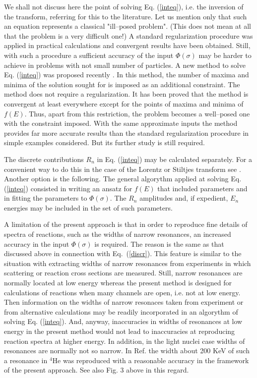 \documentclass[12pt,ams,preprint,a4paper]{revtex4}
\begin{document}
We shall not discuss here the point of solving Eq. (\ref{inteq}), i.e. the inversion of the transform,
referring for this to the literature. Let us mention only that such an equation
represents a classical "ill--posed problem". (This does not mean at all that the problem is a 
very difficult one!)
A standard 
regularization procedure was applied in practical calculations and convergent results
have been obtained. Still, with such a procedure 
a sufficient accuracy of the input $\Phi(\sigma)$ 
 may be harder to achieve in problems with not small number of particles. 
A new method to solve Eq. (\ref{inteq}) was proposed recently \cite{efr12}. 
In this method, the number of
maxima and minima of the solution sought for is imposed as an additional constraint. 
The method does not require a regularization. It has been proved 
that the method is convergent at least everywhere 
 except for the points of maxima and minima of $f(E)$. 
Thus, apart from this restriction, 
the problem becomes a well--posed one with the constraint imposed.
 With the same
approximate inputs the method provides far more accurate results than 
the standard regularization procedure in simple examples considered. But its further study 
is still required.

The discrete contributions $R_n$ in Eq. (\ref{inteq}) may be calculated separately. For a convenient way
to do this in the case of the Lorentz or Stiltjes transform see \cite{efr99}. Another option is 
the following. The general algorythm applied at solving Eq. (\ref{inteq}) consisted in writing an ansatz
for $f(E)$ that included parameters and in fitting the parameters to $\Phi(\sigma)$. 
The $R_n$ amplitudes and, if expedient, $E_n$ energies may be included in the set of such parameters.  

A limitation of the present approach is that in order to reproduce fine details of spectra of 
reactions, such as the widths of narrow resonances, an increased accuracy in the input 
$\Phi(\sigma)$ is required. The reason is the same as that discussed above in connection with Eq.~(\ref{discr}). 
This feature is similar to the situation with extracting widths of 
narrow resonances from experiments in which scattering or reaction cross sections are measured.
Still, narrow resonances are normally located at low energy whereas the present method is designed
for calculations of reactions when many channels are open, i.e. not at low energy. Then information
on the widths of narrow resonaces taken from experiment or from 
alternative calculations may be readily incorporated 
in an algorythm of solving Eq. (\ref{inteq}). And, anyway, inaccuracies
in widths of resonances at low energy in the present method would not lead to inaccuracies 
at reproducing reaction spectra at higher energy. In addition, in the light nuclei case 
widths of resonances are normally not so narrow. In Ref. \cite{leid} the width about
200 KeV of such 
a resonance in $^4$He was reproduced with a 
reasonable accuracy in the framework of the present approach.
See also Fig. 3 above in this regard.
\end{document}
